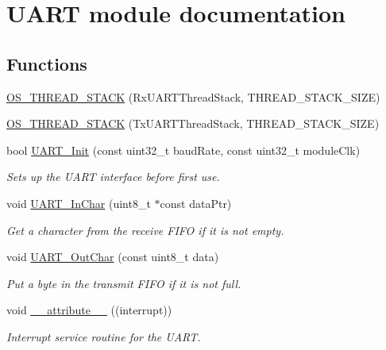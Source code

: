 \hypertarget{group___u_a_r_t__module}{}\section{U\+A\+R\+T module documentation}
\label{group___u_a_r_t__module}
\subsection*{Functions}
\begin{DoxyCompactItemize}
\item 
\hyperlink{group___u_a_r_t__module_ga2dc6c99815245d0539b23bd5ef9301b1}{O\+S\+\_\+\+T\+H\+R\+E\+A\+D\+\_\+\+S\+T\+A\+C\+K} (Rx\+U\+A\+R\+T\+Thread\+Stack, T\+H\+R\+E\+A\+D\+\_\+\+S\+T\+A\+C\+K\+\_\+\+S\+I\+Z\+E)
\item 
\hyperlink{group___u_a_r_t__module_ga3256718fed574cf8e1a1a2912218e8ac}{O\+S\+\_\+\+T\+H\+R\+E\+A\+D\+\_\+\+S\+T\+A\+C\+K} (Tx\+U\+A\+R\+T\+Thread\+Stack, T\+H\+R\+E\+A\+D\+\_\+\+S\+T\+A\+C\+K\+\_\+\+S\+I\+Z\+E)
\item 
bool \hyperlink{group___u_a_r_t__module_gae5760d1a086ec79a33901db253000af9}{U\+A\+R\+T\+\_\+\+Init} (const uint32\+\_\+t baud\+Rate, const uint32\+\_\+t module\+Clk)
\begin{DoxyCompactList}\small\item\em Sets up the U\+A\+R\+T interface before first use. \end{DoxyCompactList}\item 
void \hyperlink{group___u_a_r_t__module_ga2825651a32e14bba982ea79dbc505ef7}{U\+A\+R\+T\+\_\+\+In\+Char} (uint8\+\_\+t $\ast$const data\+Ptr)
\begin{DoxyCompactList}\small\item\em Get a character from the receive F\+I\+F\+O if it is not empty. \end{DoxyCompactList}\item 
void \hyperlink{group___u_a_r_t__module_ga0bf706acb65883a6fe98326fbb490038}{U\+A\+R\+T\+\_\+\+Out\+Char} (const uint8\+\_\+t data)
\begin{DoxyCompactList}\small\item\em Put a byte in the transmit F\+I\+F\+O if it is not full. \end{DoxyCompactList}\item 
void \hyperlink{group___u_a_r_t__module_ga445500277ba0e363873b34cffc015745}{\+\_\+\+\_\+attribute\+\_\+\+\_\+} ((interrupt))
\begin{DoxyCompactList}\small\item\em Interrupt service routine for the U\+A\+R\+T. \end{DoxyCompactList}\end{DoxyCompactItemize}

